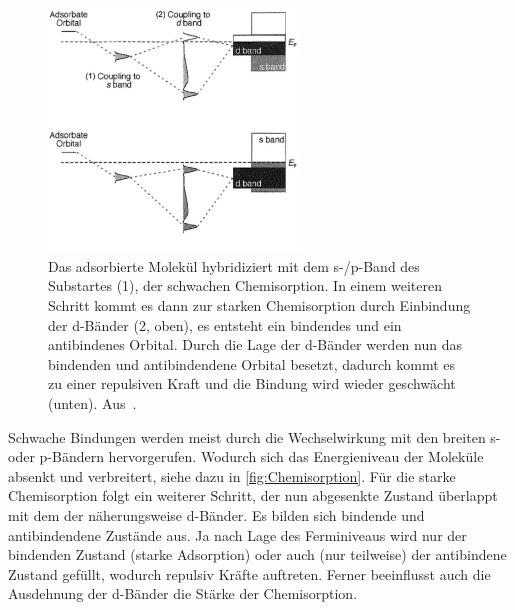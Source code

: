             \begin{figure}
                \centering
                \includegraphics[width=0.6\textwidth]{./content/pictures/Chemisorption2.PNG}
                \caption{Das adsorbierte Molekül hybridiziert mit dem s-/p-Band des Substartes (1), der schwachen Chemisorption.
                In einem weiteren Schritt kommt es dann zur starken Chemisorption durch Einbindung der d-Bänder (2, oben), es entsteht ein bindendes und ein antibindenes Orbital.
                Durch die Lage der d-Bänder werden nun das bindenden und antibindendene Orbital besetzt, dadurch kommt es zu einer repulsiven Kraft und die Bindung wird wieder geschwächt (unten). Aus~\cite{IF_1}.}
                \label{fig:Chemisorption}
            \end{figure}
            Schwache Bindungen werden meist durch die Wechselwirkung mit den breiten s- oder p-Bändern hervorgerufen.
            Wodurch sich das Energieniveau der Moleküle absenkt und verbreitert, siehe dazu in \autoref{fig:Chemisorption}.
            Für die starke Chemisorption folgt ein weiterer Schritt, der nun abgesenkte Zustand überlappt mit dem der näherungsweise d-Bänder.
            Es bilden sich bindende und antibindendene Zustände aus.
            Ja nach Lage des Ferminiveaus wird nur der bindenden Zustand (starke Adsorption) oder auch (nur teilweise) der antibindene Zustand gefüllt, wodurch repulsiv Kräfte auftreten.
            Ferner beeinflusst auch die Ausdehnung der d-Bänder die Stärke der Chemisorption.
        
